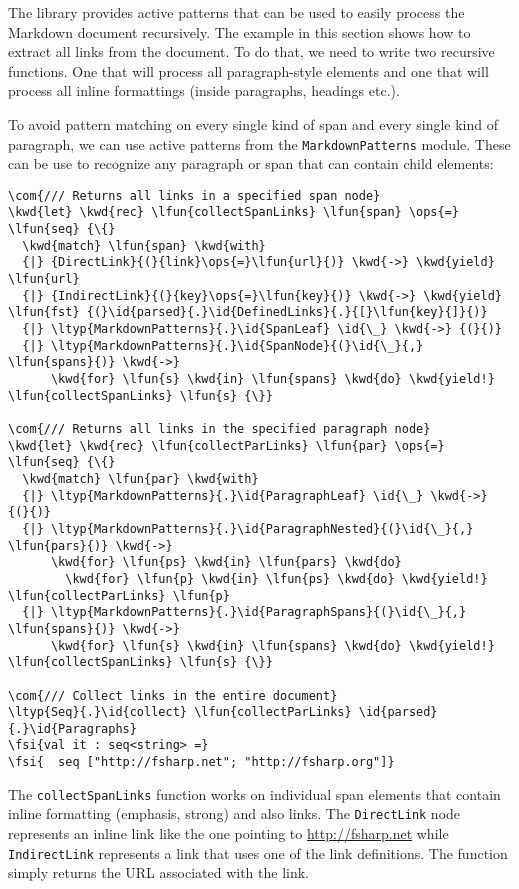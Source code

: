 \documentclass{article}
\newcommand{\id}[1]{\textcolor{black}{#1}}
\newcommand{\com}[1]{\textcolor{officegreen}{#1}}
\newcommand{\kwd}[1]{\textcolor{navy}{#1}}
\newcommand{\ops}[1]{\textcolor{purple}{#1}}
\newcommand{\fsi}[1]{\textcolor{outputcolor}{#1}}
\begin{document}
The library provides active patterns that can be used to easily process the Markdown
document recursively. The example in this section shows how to extract all links from the
document. To do that, we need to write two recursive functions. One that will process
all paragraph-style elements and one that will process all inline formattings (inside
paragraphs, headings etc.).


To avoid pattern matching on every single kind of span and every single kind of
paragraph, we can use active patterns from the \texttt{MarkdownPatterns} module. These can be use
to recognize any paragraph or span that can contain child elements:
\begin{Verbatim}[commandchars=\\\{\}]
\com{/// Returns all links in a specified span node}
\kwd{let} \kwd{rec} \lfun{collectSpanLinks} \lfun{span} \ops{=} \lfun{seq} {\{}
  \kwd{match} \lfun{span} \kwd{with}
  {|} {DirectLink}{(}{link}\ops{=}\lfun{url}{)} \kwd{->} \kwd{yield} \lfun{url}
  {|} {IndirectLink}{(}{key}\ops{=}\lfun{key}{)} \kwd{->} \kwd{yield} \lfun{fst} {(}\id{parsed}{.}\id{DefinedLinks}{.}{[}\lfun{key}{]}{)}
  {|} \ltyp{MarkdownPatterns}{.}\id{SpanLeaf} \id{\_} \kwd{->} {(}{)}
  {|} \ltyp{MarkdownPatterns}{.}\id{SpanNode}{(}\id{\_}{,} \lfun{spans}{)} \kwd{->}
      \kwd{for} \lfun{s} \kwd{in} \lfun{spans} \kwd{do} \kwd{yield!} \lfun{collectSpanLinks} \lfun{s} {\}}
      
\com{/// Returns all links in the specified paragraph node}
\kwd{let} \kwd{rec} \lfun{collectParLinks} \lfun{par} \ops{=} \lfun{seq} {\{}
  \kwd{match} \lfun{par} \kwd{with}
  {|} \ltyp{MarkdownPatterns}{.}\id{ParagraphLeaf} \id{\_} \kwd{->} {(}{)}
  {|} \ltyp{MarkdownPatterns}{.}\id{ParagraphNested}{(}\id{\_}{,} \lfun{pars}{)} \kwd{->} 
      \kwd{for} \lfun{ps} \kwd{in} \lfun{pars} \kwd{do} 
        \kwd{for} \lfun{p} \kwd{in} \lfun{ps} \kwd{do} \kwd{yield!} \lfun{collectParLinks} \lfun{p} 
  {|} \ltyp{MarkdownPatterns}{.}\id{ParagraphSpans}{(}\id{\_}{,} \lfun{spans}{)} \kwd{->}
      \kwd{for} \lfun{s} \kwd{in} \lfun{spans} \kwd{do} \kwd{yield!} \lfun{collectSpanLinks} \lfun{s} {\}}

\com{/// Collect links in the entire document}
\ltyp{Seq}{.}\id{collect} \lfun{collectParLinks} \id{parsed}{.}\id{Paragraphs}
\fsi{val it : seq<string> =}
\fsi{  seq ["http://fsharp.net"; "http://fsharp.org"]}
\end{Verbatim}



The \texttt{collectSpanLinks} function works on individual span elements that contain inline
formatting (emphasis, strong) and also links. The \texttt{DirectLink} node represents an inline
link like the one pointing to \href{http://fsharp.net}{http://fsharp.net} while \texttt{IndirectLink} represents a
link that uses one of the link definitions. The function simply returns the URL associated
with the link.
\end{document}
